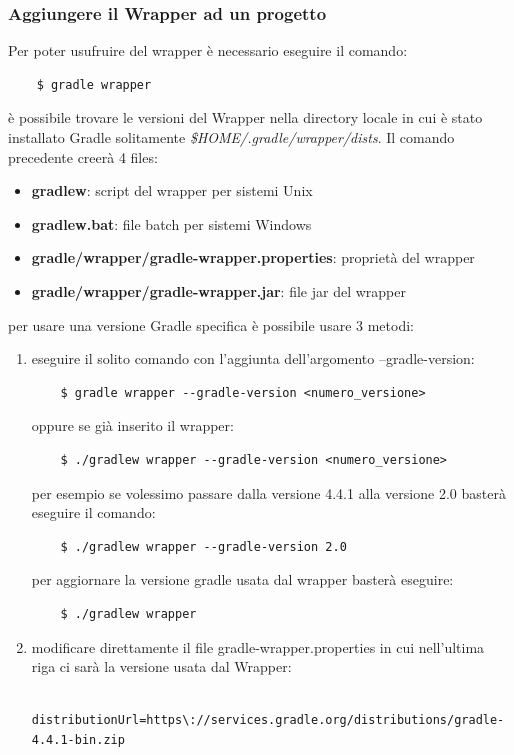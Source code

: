 \documentclass{article}
\begin{document}
\begin{flushleft}
\subsubsection{Aggiungere il Wrapper ad un progetto}
Per poter usufruire del wrapper è necessario eseguire il comando:
\begin{verbatim}
    $ gradle wrapper \end{verbatim}
è possibile trovare le versioni del Wrapper nella directory locale in cui è stato installato Gradle solitamente \textit{\$HOME/.gradle/wrapper/dists}. Il comando precedente creerà 4 files:
\begin{itemize}
    \item \textbf{gradlew}: script del wrapper per sistemi Unix
    \item \textbf{gradlew.bat}: file batch per sistemi Windows
    \item \textbf{gradle/wrapper/gradle-wrapper.properties}: proprietà del wrapper
    \item \textbf{gradle/wrapper/gradle-wrapper.jar}: file jar del wrapper
\end{itemize}
per usare una versione Gradle specifica è possibile usare 3 metodi:
\begin{enumerate}
    \item eseguire il solito comando con l'aggiunta dell'argomento --gradle-version:
\begin{verbatim}
    $ gradle wrapper --gradle-version <numero_versione> \end{verbatim}
oppure se già inserito il wrapper:
\begin{verbatim}
    $ ./gradlew wrapper --gradle-version <numero_versione> \end{verbatim}
per esempio se volessimo passare dalla versione 4.4.1 alla versione 2.0 basterà eseguire il comando:
\begin{verbatim}
    $ ./gradlew wrapper --gradle-version 2.0 \end{verbatim}
per aggiornare la versione gradle usata dal wrapper basterà eseguire:
\begin{verbatim}
    $ ./gradlew wrapper \end{verbatim}
    \item modificare direttamente il file gradle-wrapper.properties in cui nell'ultima riga ci sarà la versione usata dal Wrapper:
\begin{verbatim}
    distributionUrl=https\://services.gradle.org/distributions/gradle-4.4.1-bin.zip \end{verbatim}

\end{enumerate}
\end{flushleft}
\end{document}
